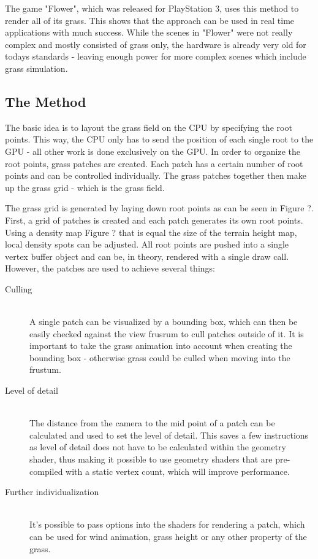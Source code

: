 \documentclass[conference]{acmsiggraph}
\begin{document}
The game "Flower", which was released for PlayStation 3, uses this method to render all of its grass. This shows that the approach can be used in real time applications with much success. While the scenes in "Flower" were not really complex and mostly consisted of grass only, the hardware is already very old for todays standards - leaving enough power for more complex scenes which include grass simulation.

\subsection{The Method}
The basic idea is to layout the grass field on the CPU by specifying the root points. This way, the CPU only has to send the position of each single root to the GPU - all other work is done exclusively on the GPU. In order to organize the root points, grass patches are created. Each patch has a certain number of root points and can be controlled individually. The grass patches together then make up the grass grid - which is the grass field.

The grass grid is generated by laying down root points as can be seen in Figure {?}. First, a grid of patches is created and each patch generates its own root points. Using a density map {Figure ?} that is equal the size of the terrain height map, local density spots can be adjusted. All root points are pushed into a single vertex buffer object and can be, in theory, rendered with a single draw call. However, the patches are used to achieve several things:

\begin{description}
  \item[Culling] \hfill \\
  A single patch can be visualized by a bounding box, which can then be easily checked against the view frusrum to cull patches outside of it. It is important to take the grass animation into account when creating the bounding box - otherwise grass could be culled when moving into the frustum.
  \item[Level of detail] \hfill \\
  The distance from the camera to the mid point of a patch can be calculated and used to set the level of detail. This saves a few instructions as level of detail does not have to be calculated within the geometry shader, thus making it possible to use geometry shaders that are pre-compiled with a static vertex count, which will improve performance.
  \item[Further individualization] \hfill \\
	It's possible to pass options into the shaders for rendering a patch, which can be used for wind animation, grass height or any other property of the grass.
\end{description}
\end{document}

